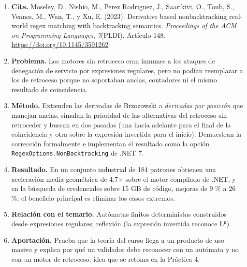 \begin{enumerate}
\def\labelenumi{\arabic{enumi}.}
\tightlist
\item
  \textbf{Cita.} Moseley, D., Nishio, M., Perez Rodriguez, J., Saarikivi, O., Toub, S., Veanes, M., Wan, T., y Xu, E. (2023). Derivative based nonbacktracking real-world regex matching with backtracking semantics. \emph{Proceedings of the ACM on Programming Languages}, \emph{7}(PLDI), Artículo 148. \url{https://doi.org/10.1145/3591262}
\item
  \textbf{Problema.} Los motores sin retroceso eran inmunes a los ataques de denegación de servicio por expresiones regulares, pero no podían reemplazar a los de retroceso porque no soportaban anclas, contadores ni el mismo resultado de coincidencia.
\item
  \textbf{Método.} Extienden las derivadas de Brzozowski a \emph{derivadas por posición} que manejan anclas, simulan la prioridad de las alternativas del retroceso sin retroceder y buscan en dos pasadas (una hacia adelante para el final de la coincidencia y otra sobre la expresión invertida para el inicio). Demuestran la corrección formalmente e implementan el resultado como la opción \texttt{RegexOptions.NonBacktracking} de .NET 7.
\item
  \textbf{Resultado.} En un conjunto industrial de 184 patrones obtienen una aceleración media geométrica de 4.7× sobre el motor compilado de .NET, y en la búsqueda de credenciales sobre 15 GB de código, mejoras de 9 \% a 26 \%; el beneficio principal es eliminar los casos extremos.
\item
  \textbf{Relación con el temario.} Autómatas finitos deterministas construidos desde expresiones regulares; reflexión (la expresión invertida reconoce Lᴿ).
\item
  \textbf{Aportación.} Prueba que la teoría del curso llega a un producto de uso masivo y explica por qué un validador debe reconocer con un autómata y no con un motor de retroceso, idea que se retoma en la Práctica 4.
\end{enumerate}
